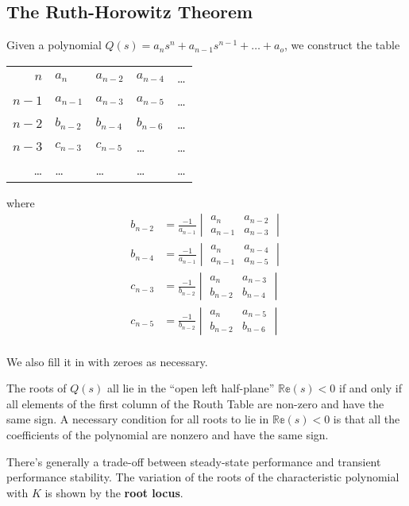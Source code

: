 \documentclass[12pt]{article}
\begin{document}
\subsection{The Ruth-Horowitz Theorem}
Given a polynomial $Q(s) = a_ns^n + a_{n-1}s^{n-1} + \dots + a_o$, we construct the table
\begin{table}[ht]
\centering
  \begin{tabular}{r|llll}
  $n$     & $a_n$     & $a_{n-2}$ & $a_{n-4}$ & \dots \\
  $n - 1$ & $a_{n-1}$ & $a_{n-3}$ & $a_{n-5}$ & \dots \\
  $n - 2$ & $b_{n-2}$ & $b_{n-4}$ & $b_{n-6}$ & \dots \\
  $n - 3$ & $c_{n-3}$ & $c_{n-5}$ & \dots     & \dots \\
  \dots   & \dots     & \dots     & \dots     & \dots \\
  \end{tabular}
\end{table}
where
\begin{align*}
b_{n-2} &= \frac{-1}{a_{n-1}} \begin{vmatrix} a_n & a_{n-2} \\ a_{n-1} & a_{n-3} \end{vmatrix} \\
b_{n-4} &= \frac{-1}{a_{n-1}} \begin{vmatrix} a_n & a_{n-4} \\ a_{n-1} & a_{n-5} \end{vmatrix} \\
c_{n-3} &= \frac{-1}{b_{n-2}} \begin{vmatrix} a_n & a_{n-3} \\ b_{n-2} & b_{n-4} \end{vmatrix} \\
c_{n-5} &= \frac{-1}{b_{n-2}} \begin{vmatrix} a_n & a_{n-5} \\ b_{n-2} & b_{n-6} \end{vmatrix} \\
\end{align*}

We also fill it in with zeroes as necessary.

The roots of $Q(s)$ all lie in the ``open left half-plane'' $\mathbb{Re}(s) < 0$ if and only if all elements of the first column of the Routh Table are non-zero and have the same sign. A necessary condition for all roots to lie in $\mathbb{Re}(s) < 0$ is that all the coefficients of the polynomial are nonzero and have the same sign.

There's generally a trade-off between steady-state performance and transient performance stability. The variation of the roots of the characteristic polynomial with $K$ is shown by the {\bf root locus}.
\end{document}
